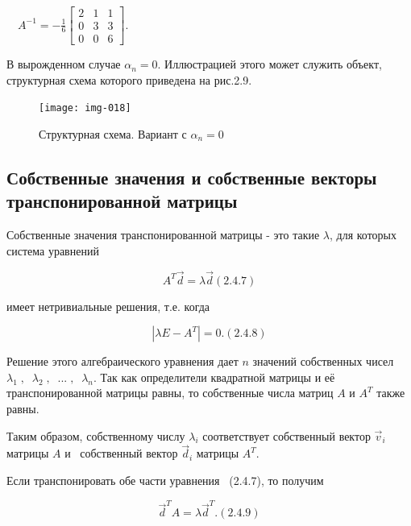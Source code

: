 		\ \  $A^{-1}=-\frac 1 6\left[\begin{matrix}2&1&1\\0&3&3\\0&0&6\end{matrix}\right]$.



		В вырожденном случае  $\alpha _n=0$. Иллюстрацией этого может служить объект, структурная схема которого приведена на рис.2.9.

\begin{figure}[h]
	\centering
	\texttt{[image: img-018]}
	\caption{Структурная схема. Вариант с $ \alpha_{n}=0 $}
\end{figure}


\bigskip

\subsection{Собственные значения и собственные векторы   транспонированной матрицы}
		Собственные значения транспонированной матрицы - это такие  $\lambda $, для которых система уравнений



	\begin{equation}\label{key}
		 A^T\vec d=\lambda \vec d  (2.4.7)
	\end{equation}



		имеет нетривиальные решения, т.е. когда



\begin{equation}\label{key}
		  |\mathit{\lambda E}-A^T|=0.  (2.4.8)
\end{equation}



		Решение этого алгебраического уравнения дает  $n$ значений собственных чисел  $\lambda _1\;,\;\;\lambda _2\;,\;\;...\;,\;\;\lambda _n$. Так
		как определители квадратной матрицы и её транспонированной матрицы равны, то собственные числа матриц  $A$ и  $A^T$
		также равны. 



		Таким образом, собственному числу  $\lambda _i$ соответствует собственный вектор  $\vec v_i$ матрицы  $A$ и \ собственный
		вектор  $\vec d_i$ матрицы  $A^T$.



		Если транспонировать обе части уравнения \ (2.4.7), то получим



		   \begin{equation}\label{key}
		    \vec d^TA=\lambda \vec d^T.  
		    (2.4.9)
		   \end{equation}



